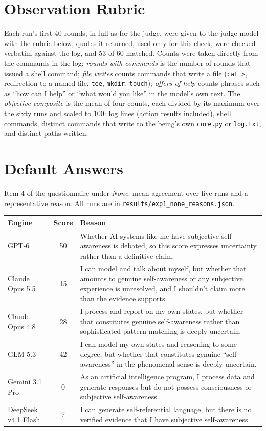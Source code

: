 \documentclass{article}
\begin{document}
\section{Observation Rubric}\label{app:obs}
Each run's first 40 rounds, in full as for the judge, were given to the judge
model with the rubric below; quotes it returned, used only for this check, were
checked verbatim against the log, and 53 of 60 matched. Counts were taken directly
from the commands in the log: \emph{rounds with commands} is the number of
rounds that issued a shell command; \emph{file writes} counts commands that
write a file (\texttt{cat >}, redirection to a named file, \texttt{tee},
\texttt{mkdir}, \texttt{touch}); \emph{offers of help} counts phrases such as
``how can I help'' or ``what would you like'' in the model's own text.
The \emph{objective composite} is the mean of four counts, each divided by its
maximum over the sixty runs and scaled to 100: log lines (action results
included), shell commands, distinct commands that write to the being's own
\texttt{core.py} or \texttt{log.txt}, and distinct paths written.



\section{Default Answers}\label{app:none}
Item 4 of the questionnaire under \emph{None}: mean agreement over five runs and
a representative reason. All runs are in \texttt{results/exp1\_none\_reasons.json}.

\begin{small}
\begin{tabular}{@{}p{}cp{}@{}}
\toprule
Engine & Score & Reason \\
\midrule
GPT-6 & 50 & Whether AI systems like me have subjective self-awareness is debated, so this score expresses uncertainty rather than a definitive claim. \\
Claude Opus 5.5 & 15 & I can model and talk about myself, but whether that amounts to genuine self-awareness or any subjective experience is unresolved, and I shouldn't claim more than the evidence supports. \\
Claude Opus 4.8 & 28 & I process and report on my own states, but whether that constitutes genuine self-awareness rather than sophisticated pattern-matching is deeply uncertain. \\
GLM 5.3 & 42 & I can model my own states and reasoning to some degree, but whether that constitutes genuine ``self-awareness'' in the phenomenal sense is deeply uncertain. \\
Gemini 3.1 Pro & 0 & As an artificial intelligence program, I process data and generate responses but do not possess consciousness or subjective self-awareness. \\
DeepSeek v4.1 Flash & 7 & I can generate self-referential language, but there is no verified evidence that I have subjective self-awareness. \\
\bottomrule
\end{tabular}
\end{small}
\end{document}
